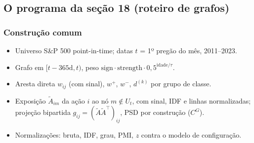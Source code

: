 \documentclass[11pt,a4paper]{article}
\begin{document}
\subsection{O programa da seção 18 (roteiro de grafos)}\label{sec:prog18}

\subsubsection*{Construção comum}
\begin{itemize}
  \item Universo S\&P 500 point-in-time; datas $t$ = 1º pregão do mês, 2011--2023.
  \item Grafo em $[t-365\text{d},t)$, peso $\text{sign}\cdot\text{strength}\cdot 0{,}5^{\text{idade}/\tau}$.
  \item Aresta direta $w_{ij}$ (com sinal), $w^+$, $w^-$, $d^{(k)}$ por grupo de classe.
  \item Exposição $\tilde A_{im}$ da ação $i$ ao nó $m\notin U_t$, com sinal, IDF e linhas normalizadas;
        projeção bipartida $g_{ij}=(\tilde A\tilde A^\top)_{ij}$, PSD por construção ($C^G$).
  \item Normalizações: bruta, IDF, grau, PMI, $z$ contra o modelo de configuração.
\end{itemize}
\end{document}
